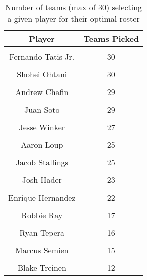 \begin{table}

\caption{Number of teams (max of 30) selecting a given player for their optimal roster}
\centering
\begin{tabular}[t]{|>{}c|>{}c|}
\hline
Player & Teams Picked\\
\hline
\cellcolor{gray!6}{Brandon Woodruff} & \cellcolor{gray!6}{30}\\
\hline
Fernando Tatis Jr. & 30\\
\hline
\cellcolor{gray!6}{Mike Zunino} & \cellcolor{gray!6}{30}\\
\hline
Shohei Ohtani & 30\\
\hline
\cellcolor{gray!6}{Walker Buehler} & \cellcolor{gray!6}{30}\\
\hline
Andrew Chafin & 29\\
\hline
\cellcolor{gray!6}{Carlos Rodon} & \cellcolor{gray!6}{29}\\
\hline
Juan Soto & 29\\
\hline
\cellcolor{gray!6}{Matt Olson} & \cellcolor{gray!6}{28}\\
\hline
Jesse Winker & 27\\
\hline
\cellcolor{gray!6}{Jose Ramirez} & \cellcolor{gray!6}{26}\\
\hline
Aaron Loup & 25\\
\hline
\cellcolor{gray!6}{Carlos Correa} & \cellcolor{gray!6}{25}\\
\hline
Jacob Stallings & 25\\
\hline
\cellcolor{gray!6}{Aaron Judge} & \cellcolor{gray!6}{24}\\
\hline
Josh Hader & 23\\
\hline
\cellcolor{gray!6}{Kendall Graveman} & \cellcolor{gray!6}{23}\\
\hline
Enrique Hernandez & 22\\
\hline
\cellcolor{gray!6}{Chad Green} & \cellcolor{gray!6}{19}\\
\hline
Robbie Ray & 17\\
\hline
\cellcolor{gray!6}{Liam Hendriks} & \cellcolor{gray!6}{16}\\
\hline
Ryan Tepera & 16\\
\hline
\cellcolor{gray!6}{Brandon Lowe} & \cellcolor{gray!6}{15}\\
\hline
Marcus Semien & 15\\
\hline
\cellcolor{gray!6}{Zack Wheeler} & \cellcolor{gray!6}{14}\\
\hline
Blake Treinen & 12\\

\end{tabular}
\end{table}
